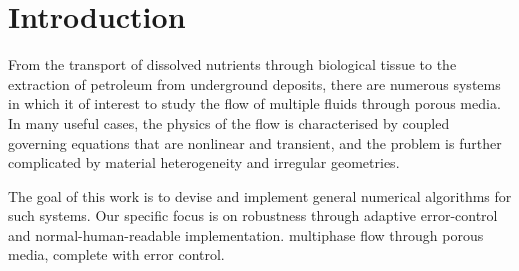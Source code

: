 \section{Introduction}
\label{introduction}

From the transport of dissolved nutrients through biological tissue to
the extraction of petroleum from underground deposits, there are
numerous systems in which it of interest to study the flow of multiple
fluids through porous media. In many useful cases, the physics of the
flow is characterised by coupled governing equations that are
nonlinear and transient, and the problem is further complicated by
material heterogeneity and irregular geometries.

The goal of this work is to devise and implement general numerical
algorithms for such systems. Our specific focus is on robustness
through adaptive error-control and normal-human-readable
implementation. multiphase flow through porous media, complete with
error control.

